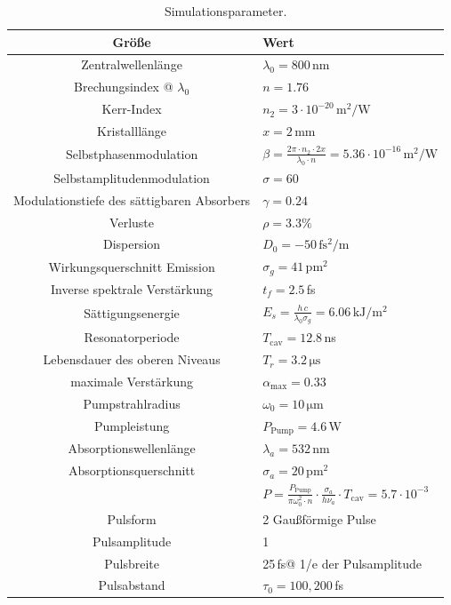 \documentclass[bachelor,       %
               twoside,        %
               BCOR10mm,       %
               liststotoc,nomtotoc,bibtotoc, %
               english,ngerman, %
               final,          %
               ]{GAUBM}
\begin{document}
\begin{table}[!htb]
	\centering
	\begin{tabular}{|c|l|}
		\hline
		Größe & Wert\\
		\hline
		Zentralwellenlänge & $\lambda_0=800\,$nm\\	
		Brechungsindex @ $\lambda_0$ & $n=1.76$\\
		Kerr-Index & $n_2=3\cdot 10^{-20}\,\si{\meter^2\per\watt}$\\
		Kristalllänge & $x=2\,$mm\\
		Selbstphasenmodulation & $\beta=\frac{2\pi\cdot n_2\cdot 2x}{\lambda_0\cdot n}=5.36\cdot 10^{-16}\,\si{\meter^2\per\watt}$\\
		Selbstamplitudenmodulation & $\sigma=60$\\
		Modulationstiefe des sättigbaren Absorbers & $\gamma=0.24$\\
		Verluste & $\rho=3.3\%$\\
		Dispersion & $D_0=-50\,\si{\femto\second^2\per\meter}$\\
		Wirkungsquerschnitt Emission & $\sigma_g=41\,\si{\pico\meter^2}$\\
		Inverse spektrale Verstärkung & $t_f=2.5\,$fs\\	
		Sättigungsenergie & $E_s=\frac{h\,c}{\lambda_0\sigma_g}= 6.06\,\si{\kilo\joule\per\meter^2}$\\
		Resonatorperiode & $T_\text{cav}=12.8\,$ns\\
		Lebensdauer des oberen Niveaus & $T_r=3.2\,\si{\micro\second}$\\
		maximale Verstärkung & $\alpha_\text{max}=0.33$\\
		Pumpstrahlradius & $\omega_0=10\,\si{\micro\meter}$\\
		Pumpleistung & $P_\text{Pump}=4.6\,$W\\
		Absorptionswellenlänge & $\lambda_a=532\,$nm\\
		Absorptionsquerschnitt & $\sigma_a=20\,\si{\pico\meter^2}$\\
		& $P=\frac{P_\text{Pump}}{\pi\omega_0^2\cdot n}\cdot\frac{\sigma_a}{h\nu_a}\cdot T_\text{cav}=5.7\cdot 10^{-3}$\\
		\hline		
		Pulsform & 2 Gaußförmige Pulse\\
		Pulsamplitude & 1\\
		Pulsbreite & 25\,fs\quad @ 1/e der Pulsamplitude\\
		Pulsabstand & $\tau_0=100,200\,$fs\\
		\hline
	\end{tabular}
	\caption{Simulationsparameter.}
	\label{tab:SimParam}
\end{table}
\end{document}
